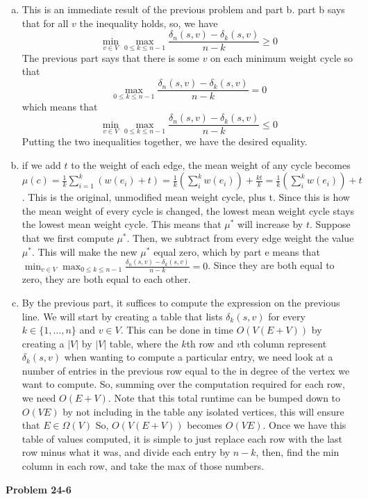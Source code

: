 \documentclass{article}
\begin{document}
\begin{enumerate}[a.]
\item
This is an immediate result of the previous problem and part b. part b says that for all $v$ the inequality holds, so, we have
\[
\min_{v\in V} \max_{0\le k\le n-1} \frac{\delta_n(s,v) - \delta_k(s,v)}{n-k} \ge 0
\]
The previous part says that there is some $v$ on each minimum weight cycle so that
\[
\max_{0\le k\le n-1} \frac{\delta_n(s,v) - \delta_k(s,v)}{n-k} = 0
\]
which means that
\[
\min_{v\in V} \max_{0\le k\le n-1} \frac{\delta_n(s,v) - \delta_k(s,v)}{n-k} \le 0
\]
Putting the two inequalities together, we have the desired equality.

\item
if we add $t$ to the weight of each edge, the mean weight of any cycle becomes $\mu(c)= \frac{1}{k} \sum_{i=1}^k(w(e_i) + t) = \frac{1}{k}\left(\sum_{i}^kw(e_i)\right) + \frac{kt}{k} = \frac{1}{k}\left(\sum_{i}^kw(e_i)\right) + t$. This is the original, unmodified mean weight cycle, plus t. Since this is how the mean weight of every cycle is changed, the lowest mean weight cycle stays the lowest mean weight cycle. This means that $\mu^*$ will increase by $t$. Suppose that we first compute $\mu^*$. Then, we subtract from every edge weight the value $\mu^*$. This will make the new $\mu^*$ equal zero, which by part e means that $\min_{v\in V} \max_{0\le k\le n-1} \frac{\delta_n(s,v) - \delta_k(s,v)}{n-k} =0$. Since they are both equal to zero, they are both equal to each other.

\item
By the previous part, it suffices to compute the expression on the previous line. We will start by creating a table that lists $\delta_k(s,v)$ for every $k\in \{1,\ldots, n\}$ and $v\in V$. This can be done in time $O(V(E+V))$ by creating a $|V|$ by $|V|$ table, where the $k$th row and $v$th column represent $\delta_k(s,v)$ when wanting to compute a particular entry, we need look at a number of entries in the previous row equal to the in degree of the vertex we want to compute. So, summing over the computation required for each row, we need $O(E+V)$. Note that this total runtime can be bumped down to $O(VE)$ by not including in the table any isolated vertices, this will ensure that $E \in \Omega(V)$ So, $O(V(E+V))$ becomes $O(VE)$. Once we have this table of values computed, it is simple to just replace each row with the last row minus what it was, and divide each entry by $n-k$, then, find the min column in each row, and take the max of those numbers.

\end{enumerate}

\noindent\textbf{Problem 24-6}\\

\end{document}
